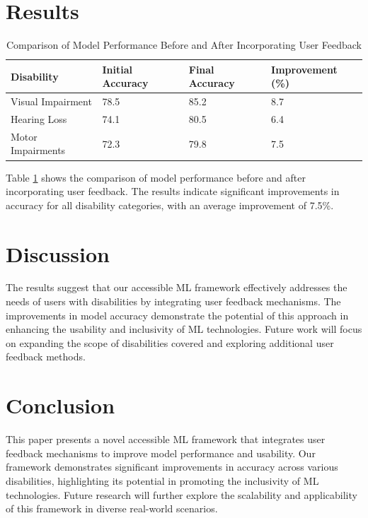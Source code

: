 \documentclass{article}
\begin{document}
\section{Results}
\label{sec:results}

\begin{table}[ht]
\centering
\caption{Comparison of Model Performance Before and After Incorporating User Feedback}
\label{tab:performance}
\begin{tabular}{@{}llll@{}}
\toprule
Disability & Initial Accuracy & Final Accuracy & Improvement (\%) \\ \midrule
Visual Impairment & 78.5 & 85.2 & 8.7 \\
Hearing Loss & 74.1 & 80.5 & 6.4 \\
Motor Impairments & 72.3 & 79.8 & 7.5 \\ \bottomrule
\end{tabular}
\end{table}

Table \ref{tab:performance} shows the comparison of model performance before and after incorporating user feedback. The results indicate significant improvements in accuracy for all disability categories, with an average improvement of 7.5\%.

\section{Discussion}
\label{sec:discussion}

The results suggest that our accessible ML framework effectively addresses the needs of users with disabilities by integrating user feedback mechanisms. The improvements in model accuracy demonstrate the potential of this approach in enhancing the usability and inclusivity of ML technologies. Future work will focus on expanding the scope of disabilities covered and exploring additional user feedback methods.

\section{Conclusion}
\label{sec:conclusion}

This paper presents a novel accessible ML framework that integrates user feedback mechanisms to improve model performance and usability. Our framework demonstrates significant improvements in accuracy across various disabilities, highlighting its potential in promoting the inclusivity of ML technologies. Future research will further explore the scalability and applicability of this framework in diverse real-world scenarios.
\end{document}
